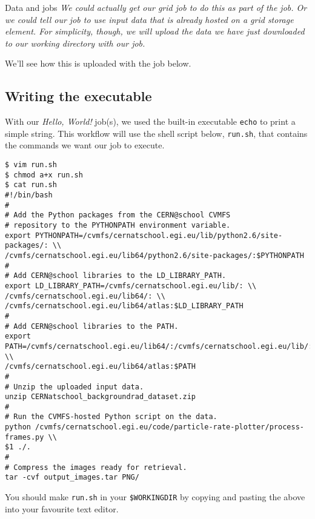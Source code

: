 \begin{infobox}{Data and jobs}
\emph{We could actually get our grid job to do this as part of the job. Or we
could tell our job to use input data that is already hosted on a grid
storage element. For simplicity, though, we will upload the data we have
just downloaded to our working directory with our job.}
\end{infobox}

We'll see how this is uploaded with the job below.

\subsection{Writing the executable}
\label{writing-the-executable}
With our \emph{Hello, World!} job(s), we used the built-in executable
\texttt{echo} to print a simple string. This workflow will use the shell
script below, \texttt{run.sh}, that contains the commands we want our
job to execute.

\begin{verbatim}
$ vim run.sh
$ chmod a+x run.sh
$ cat run.sh
#!/bin/bash
#
# Add the Python packages from the CERN@school CVMFS
# repository to the PYTHONPATH environment variable.
export PYTHONPATH=/cvmfs/cernatschool.egi.eu/lib/python2.6/site-packages/: \\
/cvmfs/cernatschool.egi.eu/lib64/python2.6/site-packages/:$PYTHONPATH
#
# Add CERN@school libraries to the LD_LIBRARY_PATH.
export LD_LIBRARY_PATH=/cvmfs/cernatschool.egi.eu/lib/: \\
/cvmfs/cernatschool.egi.eu/lib64/: \\
/cvmfs/cernatschool.egi.eu/lib64/atlas:$LD_LIBRARY_PATH
#
# Add CERN@school libraries to the PATH.
export PATH=/cvmfs/cernatschool.egi.eu/lib64/:/cvmfs/cernatschool.egi.eu/lib/: \\
/cvmfs/cernatschool.egi.eu/lib64/atlas:$PATH
#
# Unzip the uploaded input data.
unzip CERNatschool_backgroundrad_dataset.zip
#
# Run the CVMFS-hosted Python script on the data.
python /cvmfs/cernatschool.egi.eu/code/particle-rate-plotter/process-frames.py \\
$1 ./.
#
# Compress the images ready for retrieval.
tar -cvf output_images.tar PNG/
\end{verbatim}

You should make \texttt{run.sh} in your \texttt{\$WORKINGDIR} by copying
and pasting the above into your favourite text editor.

